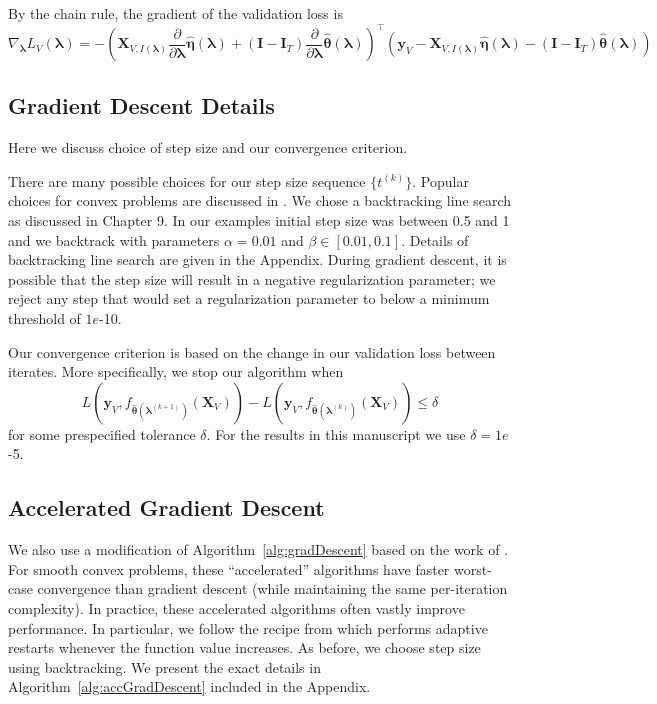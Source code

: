 \documentclass[12pt,letterpaper]{article}
\begin{document}
By the chain rule, the gradient of the validation loss is
\begin{equation*}
\nabla_{\boldsymbol{\lambda}} L_V(\boldsymbol{\lambda}) =
- \left(
\boldsymbol{X}_{V, I(\boldsymbol\lambda)} \frac{\partial}{\partial \boldsymbol{\lambda}} \hat{\boldsymbol\eta}(\boldsymbol{\lambda})
+ (\boldsymbol I - \boldsymbol{I}_T) \frac{\partial}{\partial \boldsymbol{\lambda}} \hat{\boldsymbol\theta}(\boldsymbol{\lambda})
\right )^\top
\left (
\boldsymbol{y}_V
- \boldsymbol{X}_{V, I(\boldsymbol\lambda)} \hat{\boldsymbol\eta}(\boldsymbol{\lambda})
- (\boldsymbol I - \boldsymbol{I}_T) \hat{\boldsymbol\theta}(\boldsymbol{\lambda})
\right )
\end{equation*}

\subsection{Gradient Descent Details}\label{sec:alg_details}
Here we discuss choice of step size and our convergence criterion.

There are many possible choices for our step size sequence $\{t^{(k)}\}$. Popular choices for convex problems are discussed in \citet{boyd2004convex}. We chose a backtracking line search as discussed in Chapter 9. In our examples initial step size was between 0.5 and 1 and we backtrack with parameters $\alpha = 0.01$ and $\beta \in [0.01, 0.1]$. Details of backtracking line search are given in the Appendix. During gradient descent, it is possible that the step size will result in a negative regularization parameter; we reject any step that would set a regularization parameter to below a minimum threshold of $1e$-10.

Our convergence criterion is based on the change in our validation loss between iterates. More specifically, we stop our algorithm when
\[
L \left( \boldsymbol{y}_V, f_{\hat{\boldsymbol \theta}(\boldsymbol{\lambda}^{(k+1)})}(\boldsymbol{X}_V)\right) -
L \left( \boldsymbol{y}_V, f_{\hat{\boldsymbol \theta}(\boldsymbol{\lambda}^{(k)})}(\boldsymbol{X}_V)\right) \leq \delta
\]
for some prespecified tolerance $\delta$. For the results in this manuscript we use $\delta = 1e$-5.

\subsection{Accelerated Gradient Descent}
We also use a modification of Algorithm~\ref{alg:gradDescent} based on the work of \citet{nesterov1983method}. For smooth convex problems, these ``accelerated'' algorithms have faster worst-case convergence than gradient descent (while maintaining the same per-iteration complexity). In practice, these accelerated algorithms often vastly improve performance. In particular, we follow the recipe from \citet{o2013adaptive} which performs adaptive restarts whenever the function value increases. As before, we choose step size using backtracking. We present the exact details in Algorithm~\ref{alg:accGradDescent} included in the Appendix.
\end{document}
